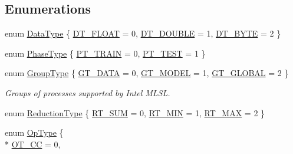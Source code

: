 \subsection*{Enumerations}
\begin{DoxyCompactItemize}
\item 
enum \hyperlink{namespaceMLSL_a09825f36959e78645dd9bc70bdf840ba}{Data\-Type} \{ \hyperlink{namespaceMLSL_a09825f36959e78645dd9bc70bdf840baaaff0417a027fdca78a786341e8738b9b}{D\-T\-\_\-\-F\-L\-O\-A\-T} = 0, 
\hyperlink{namespaceMLSL_a09825f36959e78645dd9bc70bdf840baaa95b7af7c2724d0edd7733d08bdfada5}{D\-T\-\_\-\-D\-O\-U\-B\-L\-E} = 1, 
\hyperlink{namespaceMLSL_a09825f36959e78645dd9bc70bdf840baad2c6c5e4363f8da3cc9f2c8d7c6c3296}{D\-T\-\_\-\-B\-Y\-T\-E} = 2
 \}
\item 
enum \hyperlink{namespaceMLSL_a7d1938ee24117d29200c2d29562db712}{Phase\-Type} \{ \hyperlink{namespaceMLSL_a7d1938ee24117d29200c2d29562db712a1c904b49427b2bbe7e84ee65ad939f05}{P\-T\-\_\-\-T\-R\-A\-I\-N} = 0, 
\hyperlink{namespaceMLSL_a7d1938ee24117d29200c2d29562db712a2ff42be7234d913c778f6c8cf8a259a3}{P\-T\-\_\-\-T\-E\-S\-T} = 1
 \}
\item 
enum \hyperlink{namespaceMLSL_a9629292da8a376647d4b14a34cda9b95}{Group\-Type} \{ \hyperlink{namespaceMLSL_a9629292da8a376647d4b14a34cda9b95af88ffdbe7280e91f4567aaa1529209d1}{G\-T\-\_\-\-D\-A\-T\-A} = 0, 
\hyperlink{namespaceMLSL_a9629292da8a376647d4b14a34cda9b95a86219d2c56b5d2d980fa1611e8c24353}{G\-T\-\_\-\-M\-O\-D\-E\-L} = 1, 
\hyperlink{namespaceMLSL_a9629292da8a376647d4b14a34cda9b95af7f072326039cee9c6a9c0d810c98700}{G\-T\-\_\-\-G\-L\-O\-B\-A\-L} = 2
 \}
\begin{DoxyCompactList}\small\item\em Groups of processes supported by Intel M\-L\-S\-L. \end{DoxyCompactList}\item 
enum \hyperlink{namespaceMLSL_a6513313f07b5a1b8b93ee7dd5557b27c}{Reduction\-Type} \{ \hyperlink{namespaceMLSL_a6513313f07b5a1b8b93ee7dd5557b27ca9ce70a1366a7c2d3025f3052b95163de}{R\-T\-\_\-\-S\-U\-M} = 0, 
\hyperlink{namespaceMLSL_a6513313f07b5a1b8b93ee7dd5557b27ca3c2808b1ae87ba0c3aa97195ce4b8774}{R\-T\-\_\-\-M\-I\-N} = 1, 
\hyperlink{namespaceMLSL_a6513313f07b5a1b8b93ee7dd5557b27caa478b673a991fa9c4884802138a9710d}{R\-T\-\_\-\-M\-A\-X} = 2
 \}
\item 
enum \hyperlink{namespaceMLSL_a1366e5621278eafc7ecb03de012824bf}{Op\-Type} \{ \\*
\hyperlink{namespaceMLSL_a1366e5621278eafc7ecb03de012824bfa70295c28704cb7c887a072686c4f5305}{O\-T\-\_\-\-C\-C} = 0, 

\end{DoxyCompactItemize}
